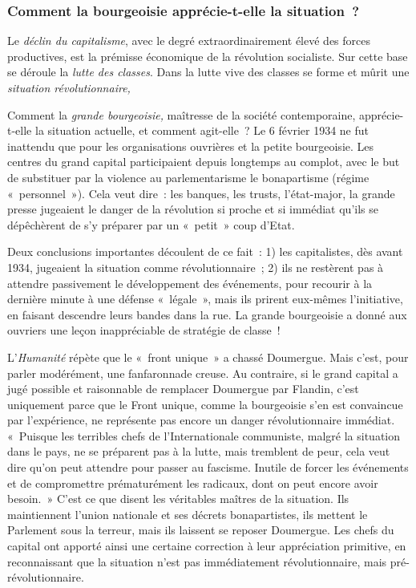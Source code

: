 \documentclass[french,twoside]{book} %
\begin{document}
\subsubsection[{Comment la bourgeoisie apprécie-t-elle la situation ?}]{Comment la bourgeoisie apprécie-t-elle la situation ?}
\noindent Le \emph{déclin du capitalisme}, avec le degré extraordinairement élevé des forces productives, est la prémisse économique de la révolution socialiste. Sur cette base se déroule la \emph{lutte des classes}. Dans la lutte vive des classes se forme et mûrit une \emph{situation révolutionnaire,}\par
Comment la \emph{grande bourgeoisie,} maîtresse de la société contemporaine, apprécie-t-elle la situation actuelle, et comment agit-elle ? Le 6 février 1934 ne fut inattendu que pour les organisations ouvrières et la petite bourgeoisie. Les centres du grand capital participaient depuis longtemps au complot, avec le but de substituer par la violence au parlementarisme le bonapartisme (régime « personnel »). Cela veut dire : les banques, les trusts, l’état-major, la grande presse jugeaient le danger de la révolution si proche et si immédiat qu’ils se dépêchèrent de s’y préparer par un « petit » coup d’Etat.\par
Deux conclusions importantes découlent de ce fait : 1) les capitalistes, dès avant 1934, jugeaient la situation comme révolutionnaire ; 2) ils ne restèrent pas à attendre passivement le développement des événements, pour recourir à la dernière minute à une défense « légale », mais  ils prirent eux-mêmes l’initiative, en faisant descendre leurs bandes dans la rue. La grande bourgeoisie a donné aux ouvriers une leçon inappréciable de stratégie de classe !\par
L’\emph{Humanité} répète que le « front unique » a chassé Doumergue. Mais c’est, pour parler modérément, une fanfaronnade creuse. Au contraire, si le grand capital a jugé possible et raisonnable de remplacer Doumergue par Flandin, c’est uniquement parce que le Front unique, comme la bourgeoisie s’en est convaincue par l’expérience, ne représente pas encore un danger révolutionnaire immédiat. « Puisque les terribles chefs de l’Internationale communiste, malgré la situation dans le pays, ne se préparent pas à la lutte, mais tremblent de peur, cela veut dire qu’on peut attendre pour passer au fascisme. Inutile de forcer les événements et de compromettre prématurément les radicaux, dont on peut encore avoir besoin. » C’est ce que disent les véritables maîtres de la situation. Ils maintiennent l’union nationale et ses décrets bonapartistes, ils mettent le Parlement sous la terreur, mais ils laissent se reposer Doumergue. Les chefs du capital ont apporté ainsi une certaine correction à leur appréciation primitive, en reconnaissant que la situation n’est pas immédiatement révolutionnaire, mais pré-révolutionnaire.\par
\end{document}

